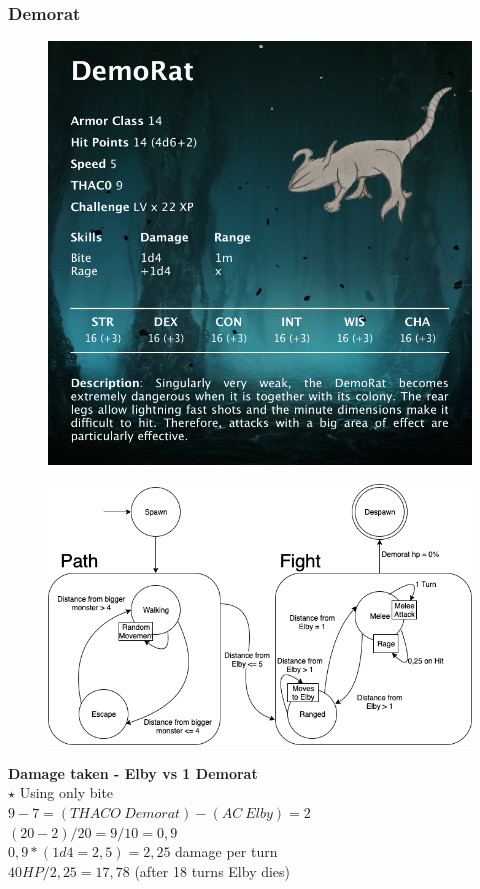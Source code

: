 \subsubsection{Demorat}
\vspace*{0.3cm}
\begin{figure}[H]
	\centering
	\includegraphics[width=0.9\linewidth]{images/visual_stats/demorat.png}
\end{figure}
\newpage
\begin{figure}[H]
	\centering
	\includegraphics[width=0.8\linewidth]{images/graphs/fsa/fsa_demorat.png}
\end{figure}
\vspace*{4mm}
\textbf{Damage taken - Elby vs 1 Demorat}\\
\newline
$\star$ Using only bite\\
$9-7 = (THACO\:Demorat) - (AC\:Elby) = 2$\\
$(20-2)/20 =9/10 = 0,9$\\
$0,9 * (1d4 = 2,5) = 2,25$ damage per turn\\
$40 HP/ 2,25 = 17,78$ (after 18 turns Elby dies)\\


